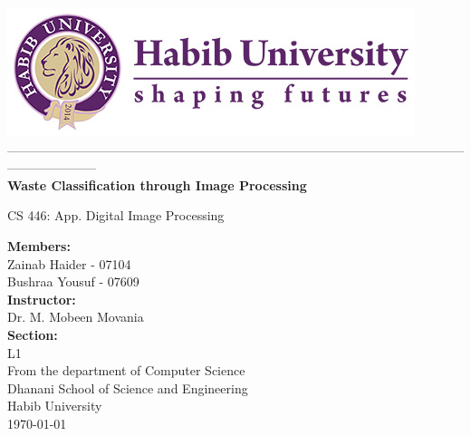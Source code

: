 \documentclass{article}
\begin{document}
\begin{titlepage}
    \centering
    \includegraphics[scale = 0.6]{logo.jpg}
    \\---------------------------------------------------------------------------------------------------------------------------------
    \vspace{0.5cm}
    \\\huge\textbf{Waste Classification through Image Processing}\par
    \vspace{0.5cm}
    \Large{CS 446: App. Digital Image Processing}\par
    \vspace{1.5cm}
    \large\textbf{Members:}
    \\ \large{Zainab Haider - 07104}
    \\ \large{Bushraa Yousuf - 07609}
    \vspace{0.5cm}
    \\\large\textbf{Instructor:}
    \\\large{Dr. M. Mobeen Movania}
    \vspace{0.5cm}
    \\\large\textbf{Section:}
    \\\large{L1}
    \vspace{1.7cm}
    \\\large{From the department of Computer Science}
    \\\large{Dhanani School of Science and Engineering}
    \\\large{Habib University}
    \\\large{\today}
\end{titlepage}

\tableofcontents
\vspace{7.3cm}
\end{document}
